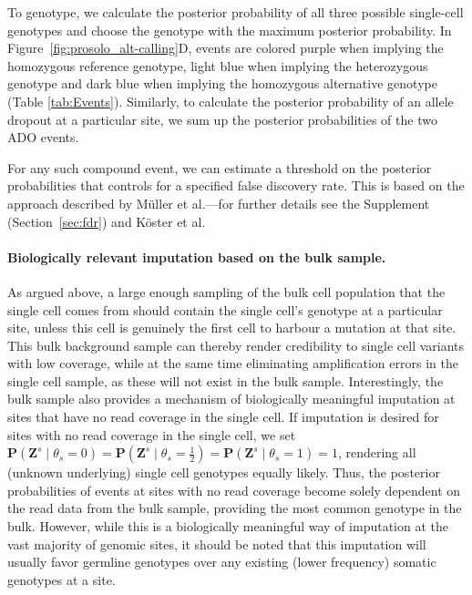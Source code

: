 \documentclass[fleqn,12pt,inline]{wlscirep}
\newcommand{\Prob}{{\mathbf{P}}}
\begin{document}
To genotype, we calculate the posterior probability of all three possible single-cell genotypes and choose the genotype with the maximum posterior probability. 
In Figure~\ref{fig:prosolo_alt-calling}D, events are colored purple when implying the homozygous reference genotype, light blue when implying the heterozygous genotype and dark blue when implying the homozygous alternative genotype (Table \ref{tab:Events}).
Similarly, to calculate the posterior probability of an allele dropout at a particular site, we sum up the posterior probabilities of the two {\ttfamily ADO} events.

For any such compound event, we can estimate a threshold on the posterior probabilities that controls for a specified false discovery rate. 
This is based on the approach described by Müller et al.\cite{muller_optimal_2004,muller_fdr_2006}---for further details see the Supplement (Section~\ref{sec:fdr}) and Köster et al\cite{koster_enhancing_2019}.

\paragraph{Biologically relevant imputation based on the bulk sample.}
As argued above, a large enough sampling of the bulk cell population that the single cell comes from should contain the single cell's genotype at a particular site, unless this cell is genuinely the first cell to harbour a mutation at that site.
This bulk background sample can thereby render credibility to single cell variants with low coverage, while at the same time eliminating amplification errors in the single cell sample, as these will not exist in the bulk sample.
Interestingly, the bulk sample also provides a mechanism of biologically meaningful imputation at sites that have no read coverage in the single cell.
If imputation is desired for sites with no read coverage in the single cell, we set $\Prob(\boldsymbol{Z}^s \mid \theta_s = 0) = \Prob(\boldsymbol{Z}^s \mid \theta_s = \frac{1}{2}) = \Prob(\boldsymbol{Z}^s \mid \theta_s = 1) = 1$, rendering all (unknown underlying) single cell genotypes equally likely.
Thus, the posterior probabilities of events at sites with no read coverage become solely dependent on the read data from the bulk sample, providing the most common genotype in the bulk.
However, while this is a biologically meaningful way of imputation at the vast majority of genomic sites, it should be noted that this imputation will usually favor germline genotypes over any existing (lower frequency) somatic genotypes at a site.
\end{document}
